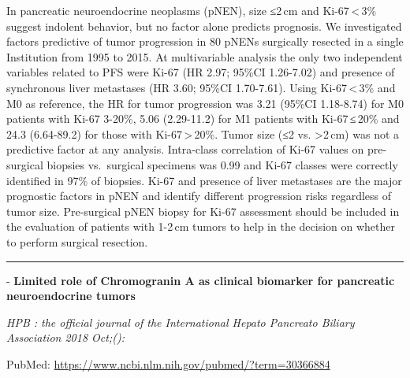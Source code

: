 \documentclass[]{article}
\begin{document}
In pancreatic neuroendocrine neoplasms (pNEN), size ≤2\,cm and
Ki-67\,\textless{}\,3\% suggest indolent behavior, but no factor alone
predicts prognosis. We investigated factors predictive of tumor
progression in 80 pNENs surgically resected in a single Institution from
1995 to 2015. At multivariable analysis the only two independent
variables related to PFS were Ki-67 (HR 2.97; 95\%CI 1.26-7.02) and
presence of synchronous liver metastases (HR 3.60; 95\%CI 1.70-7.61).
Using Ki-67\,\textless{}\,3\% and M0 as reference, the HR for tumor
progression was 3.21 (95\%CI 1.18-8.74) for M0 patients with Ki-67
3-20\%, 5.06 (2.29-11.2) for M1 patients with Ki-67\,≤\,20\% and 24.3
(6.64-89.2) for those with Ki-67\,\textgreater{}\,20\%. Tumor size (≤2
vs. \textgreater{}2\,cm) was not a predictive factor at any analysis.
Intra-class correlation of Ki-67 values on pre-surgical biopsies
vs.~surgical specimens was 0.99 and Ki-67 classes were correctly
identified in 97\% of biopsies. Ki-67 and presence of liver metastases
are the major prognostic factors in pNEN and identify different
progression risks regardless of tumor size. Pre-surgical pNEN biopsy for
Ki-67 assessment should be included in the evaluation of patients with
1-2\,cm tumors to help in the decision on whether to perform surgical
resection.

{}

{}

\begin{center}\rule{0.5\linewidth}{\linethickness}\end{center}

 - \textbf{Limited role of Chromogranin A as clinical biomarker for
pancreatic neuroendocrine tumors}

\emph{HPB : the official journal of the International Hepato Pancreato
Biliary Association 2018 Oct;():}

PubMed: \url{https://www.ncbi.nlm.nih.gov/pubmed/?term=30366884}
\end{document}
